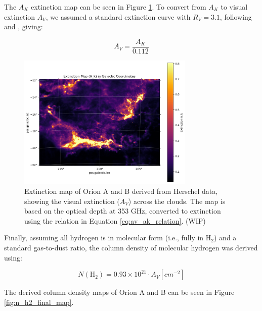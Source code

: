 The $A_K$ extinction map can be seen in Figure \ref{fig:extinction_map}. 
To convert from $A_K$ to visual extinction $A_V$, we assumed a standard extinction curve with $R_V = 3.1$, following \cite{bohlin1978survey} and \cite{rieke1985interstellar}, giving:

\begin{equation}
    A_V = \frac{A_K}{0.112}
    \label{eq:av_ak_relation}
\end{equation}

\begin{figure}
    \centering
    \includegraphics[width=0.75\textwidth]{figures/extinction_map.png}
    \caption{Extinction map of Orion A and B derived from Herschel data, showing the visual extinction ($A_V$) across the clouds. The map is based on the optical depth at 353 GHz, converted to extinction using the relation in Equation \ref{eq:av_ak_relation}. (WIP)}
    \label{fig:extinction_map}
\end{figure}

Finally, assuming all hydrogen is in molecular form (i.e., fully in H$_2$) and a standard gas-to-dust ratio, the column density of molecular hydrogen was derived using:

\begin{equation}
    N(\mathrm{H_2}) = 0.93 \times 10^{21} \cdot A_V [cm^{-2}]
    \label{eq:n_h2_av_relation}
\end{equation}

The derived column density maps of Orion A and B can be seen in Figure \ref{fig:n_h2_final_map}.

